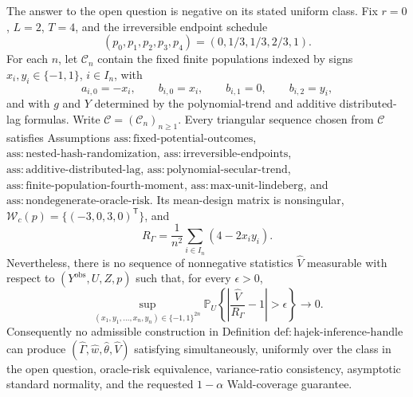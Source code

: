The answer to the open question is negative on its stated uniform class.  Fix \(r=0\), \(L=2\), \(T=4\), and the irreversible endpoint schedule
\[
 (p_0,p_1,p_2,p_3,p_4)=(0,1/3,1/3,2/3,1).
\]
For each \(n\), let \(\mathcal C_n\) contain the fixed finite populations indexed by signs \(x_i,y_i\in\{-1,1\}\), \(i\in I_n\), with
\[
 a_{i,0}=-x_i,\qquad b_{i,0}=x_i,\qquad b_{i,1}=0,
 \qquad b_{i,2}=y_i,
\]
and with \(g\) and \(Y\) determined by the polynomial-trend and additive distributed-lag formulas.  Write \(\mathcal C=(\mathcal C_n)_{n\ge1}\).  Every triangular sequence chosen from \(\mathcal C\) satisfies Assumptions \(\mathrm{ass:fixed\text{-}potential\text{-}outcomes}\), \(\mathrm{ass:nested\text{-}hash\text{-}randomization}\), \(\mathrm{ass:irreversible\text{-}endpoints}\), \(\mathrm{ass:additive\text{-}distributed\text{-}lag}\), \(\mathrm{ass:polynomial\text{-}secular\text{-}trend}\), \(\mathrm{ass:finite\text{-}population\text{-}fourth\text{-}moment}\), \(\mathrm{ass:max\text{-}unit\text{-}lindeberg}\), and \(\mathrm{ass:nondegenerate\text{-}oracle\text{-}risk}\).  Its mean-design matrix is nonsingular, \(\mathcal W_c(p)=\{(-3,0,3,0)^{\mathsf T}\}\), and
\[
 R_\Gamma=\frac1{n^2}\sum_{i\in I_n}(4-2x_i y_i).
\]
Nevertheless, there is no sequence of nonnegative statistics \(\widehat V\) measurable with respect to \((Y^{\mathrm{obs}},U,Z,p)\) such that, for every \(\epsilon>0\),
\[
 \sup_{(x_1,y_1,\ldots,x_n,y_n)\in\{-1,1\}^{2n}}
 \mathbb P_U\!\left\{\left|\frac{\widehat V}{R_\Gamma}-1\right|>\epsilon\right\}
 \longrightarrow0.
\]
Consequently no admissible construction in Definition \(\mathrm{def:hajek\text{-}inference\text{-}handle}\) can produce \((\widehat\Gamma,\widehat w,\widehat\theta,\widehat V)\) satisfying simultaneously, uniformly over the class in the open question, oracle-risk equivalence, variance-ratio consistency, asymptotic standard normality, and the requested \(1-\alpha\) Wald-coverage guarantee.